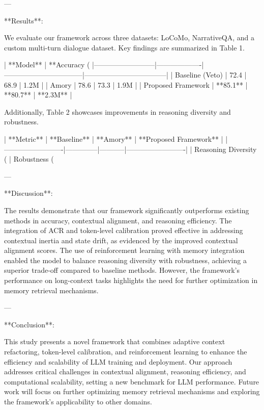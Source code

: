 ---

**Results**:  

We evaluate our framework across three datasets: LoCoMo, NarrativeQA, and a custom multi-turn dialogue dataset. Key findings are summarized in Table 1.

| **Model**                | **Accuracy (%
|--------------------------|-------------------|---------------------------------|-----------------------------------|  
| Baseline (Veto)          | 72.4             | 68.9                           | 1.2M                              |  
| Amory                   | 78.6             | 73.3                           | 1.9M                              |  
| Proposed Framework       | **85.1**         | **80.7**                       | **2.3M**                          |  

Additionally, Table 2 showcases improvements in reasoning diversity and robustness.

| **Metric**              | **Baseline** | **Amory** | **Proposed Framework** |  
|-------------------------|--------------|-----------|-------------------------|  
| Reasoning Diversity (%
| Robustness (%

---

**Discussion**:  

The results demonstrate that our framework significantly outperforms existing methods in accuracy, contextual alignment, and reasoning efficiency. The integration of ACR and token-level calibration proved effective in addressing contextual inertia and state drift, as evidenced by the improved contextual alignment scores. The use of reinforcement learning with memory integration enabled the model to balance reasoning diversity with robustness, achieving a superior trade-off compared to baseline methods. However, the framework's performance on long-context tasks highlights the need for further optimization in memory retrieval mechanisms.

---

**Conclusion**:  

This study presents a novel framework that combines adaptive context refactoring, token-level calibration, and reinforcement learning to enhance the efficiency and scalability of LLM training and deployment. Our approach addresses critical challenges in contextual alignment, reasoning efficiency, and computational scalability, setting a new benchmark for LLM performance. Future work will focus on further optimizing memory retrieval mechanisms and exploring the framework's applicability to other domains.

